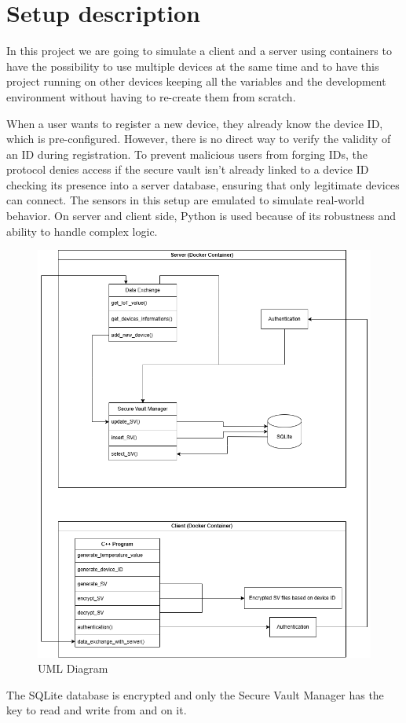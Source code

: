 \section{Setup description}
In this project we are going to simulate a client and a server using containers to have the possibility to use multiple devices at the same time and to have this project running on other devices keeping all the variables and the development environment without having to re-create them from scratch.

When a user wants to register a new device, they already know the device ID, which is pre-configured. However, there is no direct way to verify the validity of an ID during registration. To prevent malicious users from forging IDs, the protocol denies access if the secure vault isn't already linked to a device ID checking its presence into a server database, ensuring that only legitimate devices can connect. The sensors in this setup are emulated to simulate real-world behavior. On server and client side, Python is used because of its robustness and ability to handle complex logic.\\

\begin{figure}[h]
    \centering
    \includegraphics[width=.48\textwidth]{imgs/IoT_auth.png}
    \caption{UML Diagram}
    \label{fig:name}
\end{figure}

The SQLite database is encrypted and only the Secure Vault Manager has the key to read and write from and on it.